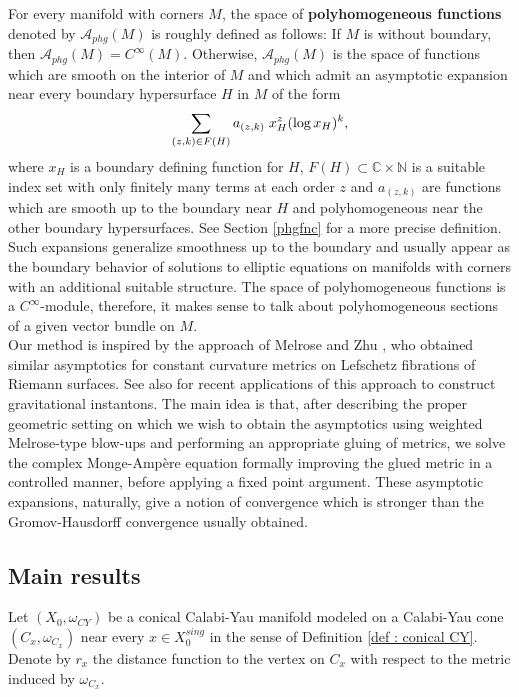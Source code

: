 \documentclass[a4paper,11pt]{article}
\def\C{\mathbb{C}}
\def\N{\mathbb{N}}
\begin{document}
For every manifold with corners $M$, the space of \textbf{polyhomogeneous functions} denoted by $\mathcal{A}_{phg}(M)$ is roughly defined as follows: If $M$ is without boundary, then $\mathcal{A}_{phg}(M) = C^\infty(M)$. Otherwise, $\mathcal{A}_{phg}(M)$ is the space of functions which are smooth on the interior of $M$ and which admit an asymptotic expansion near every boundary hypersurface $H$ in $M$ of the form 
$$
\sum_{(z, k) \in F(H)} a_{(z, k)} \hspace{0.1cm} x_H^z(\log x_H)^k,
$$
where $x_H$ is a boundary defining function for $H$, $F(H) \subset \C \times \N$ is a suitable index set with only finitely many terms at each order $z$ and $a_{(z,k)}$ are functions which are smooth up to the boundary near $H$ and polyhomogeneous near the other boundary hypersurfaces. See Section \ref{phgfnc} for a more precise definition. Such expansions generalize smoothness up to the boundary and usually appear as the boundary behavior of solutions to elliptic equations on manifolds with corners with an additional suitable structure. The space of polyhomogeneous functions is a $C^\infty$-module, therefore, it makes sense to talk about polyhomogeneous sections of a given vector bundle on $M$.\\

Our method is inspired by the approach of Melrose and Zhu \cite{melrose_resolution_2018}, who obtained similar asymptotics for constant curvature metrics on Lefschetz fibrations of Riemann surfaces. See also \cite{MR4271388, zhu2024gluing}  for recent applications of this approach to construct gravitational instantons. The main idea is that, after describing the proper geometric setting on which we wish to obtain the asymptotics using weighted Melrose-type blow-ups and performing an appropriate gluing of metrics, we solve the complex Monge-Ampère equation formally improving the glued metric in a controlled manner, before applying a fixed point argument. These asymptotic expansions, naturally, give a notion of convergence which is stronger than the Gromov-Hausdorff convergence usually obtained.

\subsection{Main results } \label{setting} 
Let $\left(X_0, \omega_{CY} \right)$ be a conical Calabi-Yau manifold modeled on a Calabi-Yau cone $(C_x, \omega_{C_x})$ near every $x \in X_0^{sing}$ in the sense of Definition \ref{def : conical CY}. Denote by $r_x$ the distance function to the vertex on $C_x$ with respect to the metric induced by $\omega_{C_x}$. \\
\end{document}
